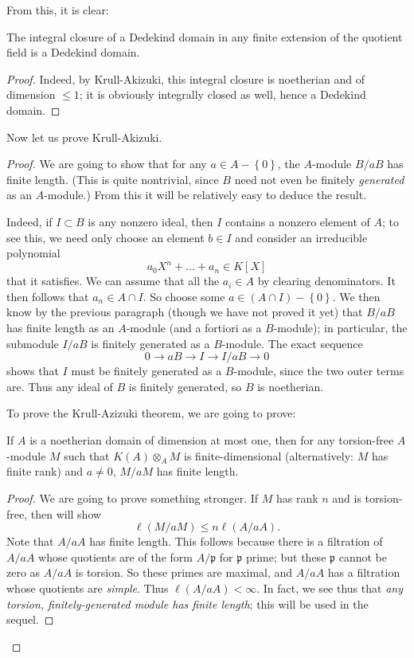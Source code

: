 From this, it is clear:

\begin{theorem} 
The integral closure of a Dedekind domain in any finite extension of the
quotient field is a Dedekind domain.
\end{theorem} 
\begin{proof} 
Indeed, by Krull-Akizuki, this integral closure is noetherian and of dimension
$\leq 1$; it is obviously integrally closed as well, hence a Dedekind domain.
\end{proof} 

Now let us prove Krull-Akizuki.
\begin{proof} 
We are going to show that for any $a \in A - \left\{0\right\}$, the $A$-module
$B/a B$ has finite length. (This is quite nontrivial, since $B$ need not even
be finitely \emph{generated} as an $A$-module.) 
From this it will be relatively easy to deduce the result.

Indeed, if $I \subset B$ is any nonzero ideal, then $I$ contains a nonzero  element of $A$; to
see this, we need only choose an element $b \in I$ and consider an irreducible polynomial
\[ a_0 X^n + \dots + a_n  \in K[X]  \]
that it satisfies. We can assume that all the $a_i \in A$ by clearing
denominators. It then follows that $a_n \in A \cap I$. 
So choose some $a \in (A \cap I) - \left\{0\right\}$. 
We then know by the previous paragraph (though we have not proved it yet) that
$B/aB$ has finite length as an $A$-module (and a fortiori as a $B$-module); in
particular, the submodule $I/aB$ is finitely generated as a
$B$-module. The
exact sequence
\[ 0 \to a B \to I \to I/aB \to 0  \]
shows that $I$ must be finitely generated as a $B$-module, since the two outer
terms are.
Thus any ideal of $B$ is finitely generated, so $B$ is noetherian.


To prove the Krull-Azizuki theorem, we are going to prove:
\begin{lemma}
If $A$ is a noetherian domain of dimension at most one, then for any
torsion-free
$A$-module $M$ such that $K(A) \otimes_A M$ is finite-dimensional
(alternatively: $M$ has finite rank) and $a \neq 0$, $M/aM$ has finite length.
\end{lemma} 
\begin{proof} 
We are going to prove something stronger. If $M$ has rank $n$ and is
torsion-free, then will show
\begin{equation} \label{boundka} \ell(M/aM) \leq n \ell(A/aA).   \end{equation}
Note that $A/aA$ has finite length. This follows because there is a filtration of
$A/aA$ whose quotients are of the form $A/\mathfrak{p}$ for $\mathfrak{p}$
prime; but these $\mathfrak{p}$ cannot be zero as $A/aA$ is torsion. So these
primes are maximal, and $A/aA$ has a filtration whose quotients are
\emph{simple}. Thus $\ell(A/aA) < \infty$. In fact, we see thus that \emph{any
torsion, finitely-generated module has finite length}; this will be used in
the sequel.



\end{proof}
\end{proof}
